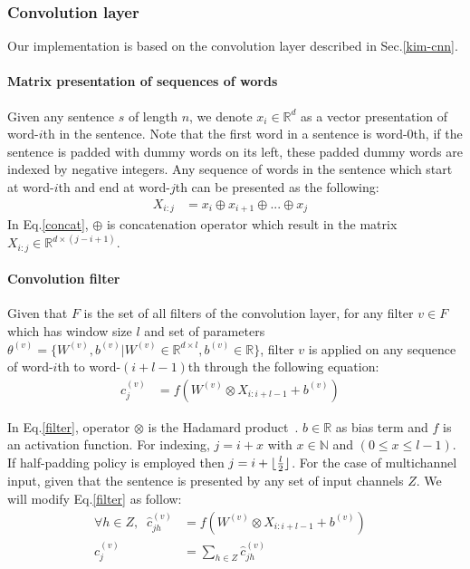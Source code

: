 \subsubsection{Convolution layer} \label{sec:conv1c}
Our implementation is based on the convolution layer described in Sec.\ref{kim-cnn}.
\paragraph{Matrix presentation of sequences of words}
Given any sentence \(s\) of length \(n\), we denote \(x_i \in \mathbb{R}^d\) as a vector presentation of word-\(i\)th in the sentence.
Note that the first word in a sentence is word-\(0\)th, if the sentence is padded with dummy words on its left, these padded dummy words are indexed by negative integers.
Any sequence of words in the sentence which start at word-\(i\)th and end at word-\(j\)th can be presented as the following:
\begin{align}
    X_{i:j} &= x_i \oplus x_{i+1} \oplus ... \oplus x_{j} &\label{concat}
\end{align}
In Eq.\eqref{concat}, \(\oplus\) is concatenation operator which result in the matrix \(X_{i:j} \in \mathbb{R}^{d \times (j-i+1)}\).

\paragraph{Convolution filter}
Given that \(F\) is the set of all filters of the convolution layer, for any filter \(v \in F\) which has window size \(l\) and set of parameters \(\theta^{(v)} = \{ W^{(v)}, b^{(v)} | W^{(v)} \in \mathbb{R}^{d \times l}, b^{(v)} \in \mathbb{R}\}\), filter \({v}\) is applied on any sequence of word-\(i\)th to word-\((i+l-1)\)th through the following equation:
\begin{align}
    c^{(v)}_j &= f(W^{(v)} \otimes X_{i:i+l-1} + b^{(v)}) &\label{filter}
\end{align}

In Eq.\eqref{filter}, operator \(\otimes\) is the Hadamard product~\cite{element-prod}.  
\(b \in \mathbb{R}\) as bias term and \(f\) is an activation function.
For indexing, \(j = i + x\) with \(x \in \mathbb{N}\) and \((0 \leq x \leq l - 1)\).
If half-padding policy is employed then \(j = i + \lfloor \frac{l}{2} \rfloor\).
For the case of multichannel input, given that the sentence is presented by any set of input channels \(Z\).
We will modify Eq.\eqref{filter} as follow:
\begin{align}
    \forall h \in Z, \; \; \hat{c}^{(v)}_{jh} &= f(W^{(v)} \otimes X_{i:i+l-1} + b^{(v)})& \\
    c^{(v)}_j &= \sum_{h \in Z} \hat{c}^{(v)}_{jh}&
\end{align}

